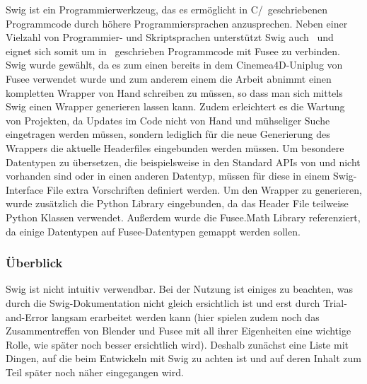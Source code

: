 \label{sec:SWIG}

Swig ist ein Programmierwerkzeug, das es ermöglicht in C/\CC~geschriebenen Programmcode durch höhere Programmiersprachen anzusprechen. Neben einer Vielzahl von Programmier- und Skriptsprachen unterstützt Swig auch \CS~und eignet sich somit um in \CC~geschrieben Programmcode mit Fusee zu verbinden. Swig wurde gewählt, da es zum einen bereits in dem Cinemea4D-Uniplug von Fusee verwendet wurde und zum anderem einem die Arbeit abnimmt einen kompletten Wrapper von Hand schreiben zu müssen, so dass man sich mittels Swig einen Wrapper generieren lassen kann. Zudem erleichtert es die Wartung von Projekten, da Updates im Code nicht von Hand und mühseliger Suche eingetragen werden müssen, sondern lediglich für die neue Generierung des Wrappers die aktuelle Headerfiles eingebunden werden müssen. Um besondere Datentypen zu übersetzen, die beispielsweise in den Standard APIs von \CC und \CS nicht vorhanden sind oder in einen anderen Datentyp, müssen für diese in einem Swig-Interface File extra Vorschriften definiert werden.
Um den Wrapper zu generieren, wurde zusätzlich die Python Library eingebunden, da das Header File teilweise Python Klassen verwendet. Außerdem wurde die Fusee.Math Library referenziert, da einige Datentypen auf Fusee-Datentypen gemappt werden sollen.

\subsubsection{Überblick}
Swig ist nicht intuitiv verwendbar. Bei der Nutzung ist einiges zu beachten, was durch die Swig-Dokumentation nicht gleich ersichtlich ist und erst durch Trial-and-Error langsam erarbeitet werden kann (hier spielen zudem noch das Zusammentreffen von Blender und Fusee mit all ihrer Eigenheiten eine wichtige Rolle, wie später noch besser ersichtlich wird). Deshalb zunächst eine Liste mit Dingen, auf die beim Entwickeln mit Swig zu achten ist und auf deren Inhalt zum Teil später noch näher eingegangen wird.

